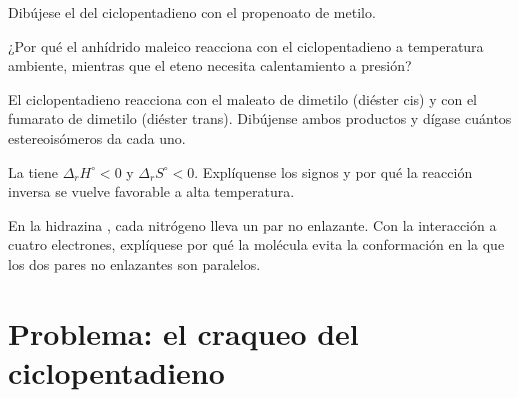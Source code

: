 \begin{exercise}[$\star\star$]\label{exo:b2:frontier-orbitals:8}
Dibújese el  del ciclopentadieno con el propenoato de metilo.
\end{exercise}

\begin{exercise}[$\star\star$]\label{exo:b2:frontier-orbitals:9}
¿Por qué el anhídrido maleico reacciona con el ciclopentadieno a temperatura ambiente, mientras que el eteno
necesita calentamiento a presión?
\end{exercise}

\begin{exercise}[$\star\star\star$]\label{exo:b2:frontier-orbitals:10}
El ciclopentadieno reacciona con el maleato de dimetilo (diéster cis) y con el fumarato de dimetilo
(diéster trans). Dibújense ambos productos y dígase cuántos estereoisómeros da cada uno.
\end{exercise}

\begin{exercise}[$\star\star\star$]\label{exo:b2:frontier-orbitals:11}
La  tiene $\Delta_r H^\circ < 0$ y $\Delta_r S^\circ < 0$. Explíquense los signos
y por qué la reacción inversa se vuelve favorable a alta temperatura.
\end{exercise}

\begin{exercise}[$\star\star\star$]\label{exo:b2:frontier-orbitals:12}
En la hidrazina , cada nitrógeno lleva un par no enlazante. Con la interacción a cuatro
electrones, explíquese por qué la molécula evita la conformación en la que los dos pares
no enlazantes son paralelos.
\end{exercise}

\section{Problema: el craqueo del ciclopentadieno}

